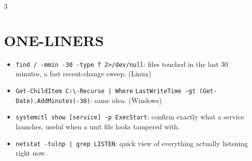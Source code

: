 \documentclass[7pt,landscape]{article}
\begin{document}
\begin{multicols*}{3}
\section{ONE-LINERS}
\begin{itemize}
    \item \texttt{find / -mmin -30 -type f 2>/dev/null}: files touched in the last 30 minutes, a fast recent-change sweep. \textcolor{linuxc}{(Linux)}
    \item \texttt{Get-ChildItem C:\textbackslash -Recurse | Where} \newline \texttt{LastWriteTime -gt (Get-Date).AddMinutes(-30)}: same idea. \textcolor{winc}{(Windows)}
    \item \texttt{systemctl show [service] -p ExecStart}: confirm exactly what a service launches, useful when a unit file looks tampered with.
    \item \texttt{netstat -tulnp | grep LISTEN}: quick view of everything actually listening right now.
\end{itemize}

\end{multicols*}
\end{document}
